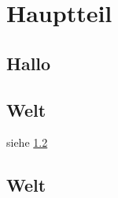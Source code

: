 \chapter{Hauptteil}
\section{Hallo}\label{sec:hallo}

\blindtext[20]


\section{Welt}\label{sec:hallo}


siehe \ref{sec:hallo}


\blindtext[20]


\section{Welt}

\blindtext[20]
